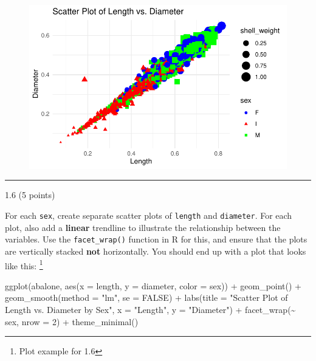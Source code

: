 \documentclass[
  letterpaper,
  DIV=11,
  numbers=noendperiod]{scrartcl}
\newenvironment{Shaded}{\begin{snugshade}}{\end{snugshade}}
\newcommand{\AttributeTok}[1]{\textcolor[rgb]{0.40,0.45,0.13}{#1}}
\newcommand{\ConstantTok}[1]{\textcolor[rgb]{0.56,0.35,0.01}{#1}}
\newcommand{\DecValTok}[1]{\textcolor[rgb]{0.68,0.00,0.00}{#1}}
\newcommand{\FunctionTok}[1]{\textcolor[rgb]{0.28,0.35,0.67}{#1}}
\newcommand{\NormalTok}[1]{\textcolor[rgb]{0.00,0.23,0.31}{#1}}
\newcommand{\SpecialCharTok}[1]{\textcolor[rgb]{0.37,0.37,0.37}{#1}}
\newcommand{\StringTok}[1]{\textcolor[rgb]{0.13,0.47,0.30}{#1}}
\begin{document}
\begin{figure}[H]

{\centering \includegraphics{hw2_files/figure-pdf/unnamed-chunk-7-1.pdf}

}

\end{figure}

\begin{center}\rule{0.5\linewidth}{0.5pt}\end{center}

1.6 (5 points)

For each \texttt{sex}, create separate scatter plots of \texttt{length}
and \texttt{diameter}. For each plot, also add a \textbf{linear}
trendline to illustrate the relationship between the variables. Use the
\texttt{facet\_wrap()} function in R for this, and ensure that the plots
are vertically stacked \textbf{not} horizontally. You should end up with
a plot that looks like this: \footnote{Plot example for 1.6}

\begin{Shaded}
\begin{Highlighting}[]
\FunctionTok{ggplot}\NormalTok{(abalone, }\FunctionTok{aes}\NormalTok{(}\AttributeTok{x =}\NormalTok{ length, }\AttributeTok{y =}\NormalTok{ diameter, }\AttributeTok{color =}\NormalTok{ sex)) }\SpecialCharTok{+}
  \FunctionTok{geom\_point}\NormalTok{() }\SpecialCharTok{+}
  \FunctionTok{geom\_smooth}\NormalTok{(}\AttributeTok{method =} \StringTok{"lm"}\NormalTok{, }\AttributeTok{se =} \ConstantTok{FALSE}\NormalTok{) }\SpecialCharTok{+}
  \FunctionTok{labs}\NormalTok{(}\AttributeTok{title =} \StringTok{"Scatter Plot of Length vs. Diameter by Sex"}\NormalTok{,}
       \AttributeTok{x =} \StringTok{"Length"}\NormalTok{, }\AttributeTok{y =} \StringTok{"Diameter"}\NormalTok{) }\SpecialCharTok{+}
  \FunctionTok{facet\_wrap}\NormalTok{(}\SpecialCharTok{\textasciitilde{}}\NormalTok{ sex, }\AttributeTok{nrow =} \DecValTok{2}\NormalTok{) }\SpecialCharTok{+}
  \FunctionTok{theme\_minimal}\NormalTok{()}
\end{Highlighting}
\end{Shaded}
\end{document}
